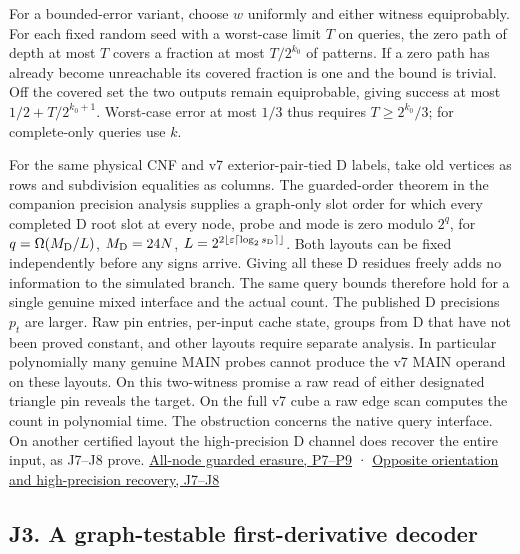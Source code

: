 \documentclass[
  11pt,
]{article}
\begin{document}
For a bounded-error variant, choose \(w\) uniformly and either witness
equiprobably. For each fixed random seed with a worst-case limit \(T\)
on queries, the zero path of depth at most \(T\) covers a fraction at
most \(T/2^{k_0}\) of patterns. If a zero path has already become
unreachable its covered fraction is one and the bound is trivial. Off
the covered set the two outputs remain equiprobable, giving success at
most \(1/2+T/2^{k_0+1}\). Worst-case error at most \(1/3\) thus requires
\(T\ge 2^{k_0}/3\); for complete-only queries use \(k\).

For the same physical CNF and v7 exterior-pair-tied D labels, take old
vertices as rows and subdivision equalities as columns. The
guarded-order theorem in the companion precision analysis supplies a
graph-only slot order for which every completed D root slot at every
node, probe and mode is zero modulo \(2^q\), for
\(q=\Omega(M_{\rm D}/L)\), \(M_{\rm D}=24N\),
\(L=2^{2\lfloor\varepsilon\lceil\log_2 s_{\rm D}\rceil\rfloor}\). Both
layouts can be fixed independently before any signs arrive. Giving all
these D residues freely adds no information to the simulated branch. The
same query bounds therefore hold for a single genuine mixed interface
and the actual count. The published D precisions \(p_t\) are larger. Raw
pin entries, per-input cache state, groups from D that have not been
proved constant, and other layouts require separate analysis. In
particular polynomially many genuine MAIN probes cannot produce the v7
MAIN operand on these layouts. On this two-witness promise a raw read of
either designated triangle pin reveals the target. On the full v7 cube a
raw edge scan computes the count in polynomial time. The obstruction
concerns the native query interface. On another certified layout the
high-precision D channel does recover the entire input, as J7--J8 prove.
\hyperref[v9-section-precision-frontier]{All-node guarded erasure, P7--P9}
· \hyperref[v9-section-moment-escape]{Opposite orientation and
high-precision recovery, J7--J8}

\subsection{J3. A graph-testable first-derivative
decoder}\label{v9-j3-a-graph-testable-first-derivative-decoder}
\end{document}

